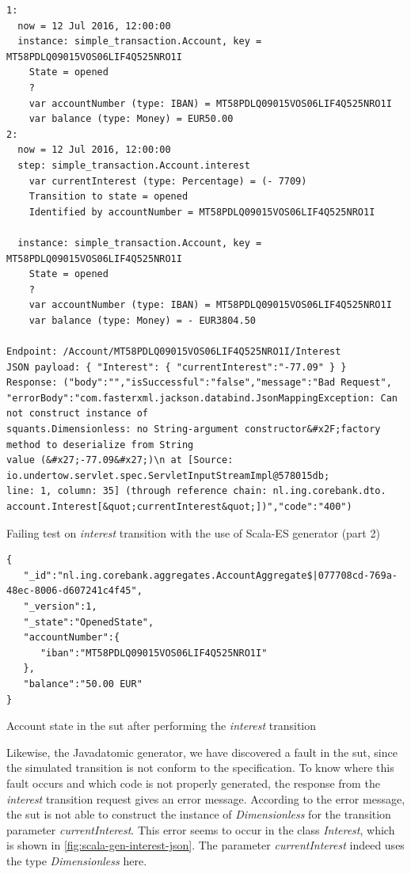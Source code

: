 \begin{sourcecode}[h!]
\begin{lstlisting}[]
1:
  now = 12 Jul 2016, 12:00:00
  instance: simple_transaction.Account, key = MT58PDLQ09015VOS06LIF4Q525NRO1I
    State = opened
    ?
    var accountNumber (type: IBAN) = MT58PDLQ09015VOS06LIF4Q525NRO1I
    var balance (type: Money) = EUR50.00
2:
  now = 12 Jul 2016, 12:00:00
  step: simple_transaction.Account.interest
    var currentInterest (type: Percentage) = (- 7709)
    Transition to state = opened
    Identified by accountNumber = MT58PDLQ09015VOS06LIF4Q525NRO1I

  instance: simple_transaction.Account, key = MT58PDLQ09015VOS06LIF4Q525NRO1I
    State = opened
    ?
    var accountNumber (type: IBAN) = MT58PDLQ09015VOS06LIF4Q525NRO1I
    var balance (type: Money) = - EUR3804.50

Endpoint: /Account/MT58PDLQ09015VOS06LIF4Q525NRO1I/Interest
JSON payload: { "Interest": { "currentInterest":"-77.09" } }
Response: ("body":"","isSuccessful":"false","message":"Bad Request",
"errorBody":"com.fasterxml.jackson.databind.JsonMappingException: Can not construct instance of
squants.Dimensionless: no String-argument constructor&#x2F;factory method to deserialize from String
value (&#x27;-77.09&#x27;)\n at [Source: io.undertow.servlet.spec.ServletInputStreamImpl@578015db;
line: 1, column: 35] (through reference chain: nl.ing.corebank.dto.
account.Interest[&quot;currentInterest&quot;])","code":"400")
\end{lstlisting}
\caption{Failing test on \textit{interest} transition with the use of Scala-ES generator (part 2)}\label{fig:result-scalaes-interest-p2}
\end{sourcecode}
\FloatBarrier

\begin{sourcecode}[h!]
\begin{lstlisting}[]
{
   "_id":"nl.ing.corebank.aggregates.AccountAggregate$|077708cd-769a-48ec-8006-d607241c4f45",
   "_version":1,
   "_state":"OpenedState",
   "accountNumber":{
      "iban":"MT58PDLQ09015VOS06LIF4Q525NRO1I"
   },
   "balance":"50.00 EUR"
}
\end{lstlisting}
\caption{Account state in the \gls{sut} after performing the \textit{interest} transition}\label{fig:interest-opened-account-scalaes-json}
\end{sourcecode}
\FloatBarrier

Likewise, the Javadatomic generator, we have discovered a fault in the \gls{sut}, since
the simulated transition is not conform to the specification. To know where this
fault occurs and which code is not properly generated, the response from the
\textit{interest} transition request gives an error message. According to the error
message, the \gls{sut} is not able to construct the instance of \textit{Dimensionless}
for the transition parameter \textit{currentInterest}. This error seems to occur
in the class \textit{Interest}, which is shown in
\autoref{fig:scala-gen-interest-json}. The parameter \textit{currentInterest}
indeed uses the type \textit{Dimensionless} here.

